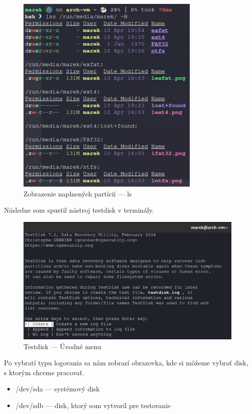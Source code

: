 \documentclass[12pt,oneside,slovak,a4paper]{article}
\begin{document}
\begin{figure}[H]
	\centering
	\includegraphics[scale=0.7]{./images/testdisk_testing/naplnenie_particii_lss.png}
	\centering
	\captionsetup{justification=centering,margin=2cm}
	\caption{Zobrazenie naplnených partícií --- ls}
\end{figure}


Následne som spustil nástroj testdisk v terminály.

\begin{figure}[H]
	\centering
	\includegraphics[scale=0.7]{./images/testdisk_testing/testdisk_UI.png}
	\centering
	\captionsetup{justification=centering,margin=2cm}
	\caption{Testdisk --- Úvodné menu}
\end{figure}

Po vybratí typu logovania sa nám zobrazí obrazovka, kde si môžeme vybrať disk, s ktorým chceme pracovať.

\begin{spacing}{1.0}	
\begin{itemize}
	\item /dev/sda --- systémový disk
	\item /dev/sdb --- disk, ktorý som vytvoril pre testovanie
\end{itemize}
\end{spacing}
\end{document}
